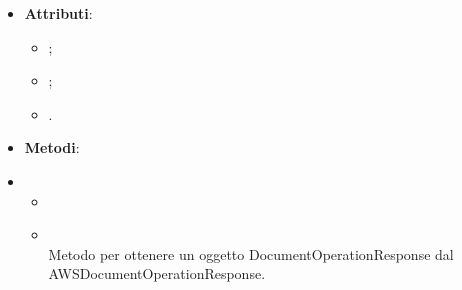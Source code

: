 \documentclass[10pt, a4paper]{article}
\begin{document}
\label{AWSDocumentOperationResponseDettaglio}
\begin{itemize}
    \item \textbf{Attributi}:
    \begin{itemize}
        \item {};
        \item {};
        \item {}.
    \end{itemize}
    \item \textbf{Metodi}:
    \item \begin{itemize}
        \item \item {}\\
        Metodo per ottenere un oggetto DocumentOperationResponse dal AWSDocumentOperationResponse.
    \end{itemize}
\end{itemize}
\end{document}

